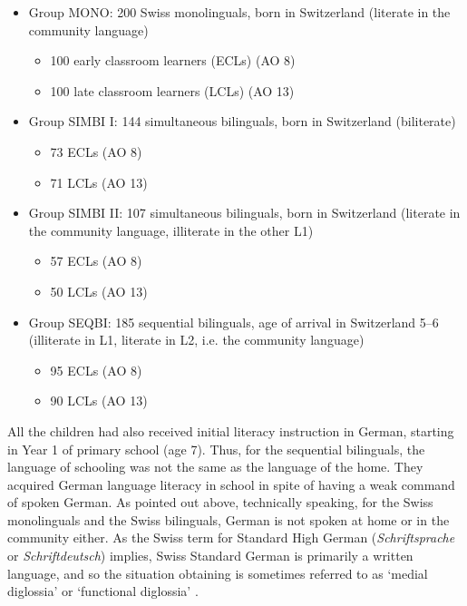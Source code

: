 \documentclass[output=paper,modfonts,nonflat,newtxmath]{langsci/langscibook}
\begin{document}
\begin{itemize}
\item
Group MONO: 200 Swiss monolinguals, born in Switzerland (literate in the community language)


\begin{itemize}
\item
100 early classroom learners (ECLs) (AO 8)

\item
100 late classroom learners (LCLs) (AO 13)

\end{itemize}
\item
Group SIMBI I: 144 simultaneous bilinguals, born in Switzerland (biliterate)


\begin{itemize}
\item
73 ECLs (AO 8)

\item
71 LCLs (AO 13)

\end{itemize}
\item
Group SIMBI II: 107 simultaneous bilinguals, born in Switzerland (literate in the community language, illiterate in the other L1)


\begin{itemize}
\item
57 ECLs (AO 8)

\item
50 LCLs (AO 13)

\end{itemize}
\item
Group SEQBI: 185 sequential bilinguals, age of arrival in Switzerland 5--6 (illiterate in L1, literate in L2, i.e. the community language)


\begin{itemize}
\item
95 ECLs (AO 8)

\item
90 LCLs (AO 13)

\end{itemize}
\end{itemize}

All the children had also received initial literacy instruction in German, starting in Year 1 of primary school (age 7). Thus, for the sequential bilinguals, the language of schooling was not the same as the language of the home. They acquired German language literacy in school in spite of having a weak command of spoken German. As pointed out above, technically speaking, for the Swiss monolinguals and the Swiss bilinguals, German is not spoken at home or in the community either. As the Swiss term for Standard High German (\textit{Schriftsprache} or \textit{Schriftdeutsch}) implies, Swiss Standard German is primarily a written language, and so the situation obtaining is sometimes referred to as ‘medial diglossia’ \citep{Kolde1981} or ‘functional diglossia’ \citep{Rash1998}.
\end{document}
